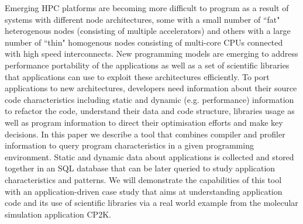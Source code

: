 Emerging HPC platforms are becoming more difficult to program as a result of systems with different node 
architectures, some with a small 
number of ``fat" heterogenous nodes (consisting of multiple accelerators) and others with a large number of ``thin" 
homogenous nodes consisting of multi-core \acsp{CPU} connected with high speed interconnects.
New programming models are emerging to address performance portability of the 
applications as well as a set of scientific libraries that applications can use to exploit these architectures efficiently. 
To port applications to new architectures, developers need information about their source code characteristics including static and dynamic (e.g. 
performance) information to refactor the code, understand their data and code structure, libraries usage as well as program information to direct their optimisation efforts and make key decisions.
In this paper we describe a tool that combines compiler and profiler information to query program 
characteristics in a given programming environment.
Static and dynamic data about applications is collected and stored together in an \acs{SQL} database that can be 
later queried to study application characteristics and patterns.
We will demonstrate the capabilities of this tool with an application-driven case study that aims at understanding 
application code and its use of scientific libraries via a real world example from the molecular simulation application 
CP2K.
